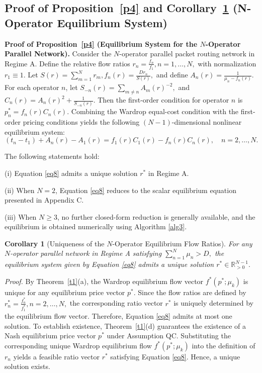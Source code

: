 \documentclass[review,3p,authoryear]{elsarticle}
\newtheorem{corollary}[theorem]{Corollary}
\begin{document}
\subsection{Proof of Proposition~\ref{p4} and Corollary~\ref{c3} (N-Operator Equilibrium System)}

\medskip\noindent\textbf{Proof of Proposition~\ref{p4} (Equilibrium System for the $N$-Operator Parallel Network).}
Consider the $N$-operator parallel packet routing network in Regime A. Define the relative flow ratios $r_{n}=\frac{f_{n}}{f_{1}},n=1,{\dots},N,$ with normalization $r_{1}\ensuremath{\equiv}1$. Let $S(r)=\sum_{m=1}^{N} r_{m},f_{n}(r)=\frac{D r_{n}}{S(r)},$ and define $A_{n}(r)=\frac{1}{{\mu}_{n}-f_{n}(r)}.$ For each operator $n$, let $S_{-n}(r)=\sum_{m{\ne}n}^{} A_{m}(r)^{-2},$ and $C_{n}(r)=A_{n}(r)^{2}+\frac{1}{S_{-n}(r)}.$ Then the first-order condition for operator $n$ is $p_{n}^{*}=f_{n}(r) C_{n}(r).$ Combining the Wardrop equal-cost condition with the first-order pricing conditions yields the following $\left(N - 1\right)$-dimensional nonlinear equilibrium system:
\begin{equation}
    (t_n - t_1) + A_n (r) - A_1 (r) = f_1 (r) C_1 (r) - f_n (r) C_n (r), \quad n = 2, \dots, N.
    \label{eq8}
\end{equation}

The following statements hold:

(i) Equation \eqref{eq8} admits a unique solution $r^{*}$ in Regime A.

(ii) When $N=2$, Equation \eqref{eq8} reduces to the scalar equilibrium equation presented in Appendix C.

(iii) When $N{\ge}3$, no further closed-form reduction is generally available, and the equilibrium is obtained numerically using Algorithm \ref{alg3}.

\begin{corollary}[Uniqueness of the $N$-Operator Equilibrium Flow Ratios]\label{c3}
For any $N$-operator parallel network in Regime A satisfying $\sum_{n=1}^{N} {\mu}_{n}>D,$ the equilibrium system given by Equation \eqref{eq8} admits a unique solution $r^{*}{\in}\mathbb{R}_{>0}^{N-1}.$
\end{corollary}

\medskip\noindent\textit{Proof.} By Theorem~\ref{t1}(a), the Wardrop equilibrium flow vector $f^{*}(p^{*};{\mu}_{k})$ is unique for any equilibrium price vector $p^{*}$. Since the flow ratios are defined by $r_{n}^{*}=\frac{f_{n}^{*}}{f_{1}^{*}},n=2,{\dots},N,$ the corresponding ratio vector $r^{*}$ is uniquely determined by the equilibrium flow vector. Therefore, Equation \eqref{eq8} admits at most one solution. To establish existence, Theorem~\ref{t1}(d) guarantees the existence of a Nash equilibrium price vector $p^{*}$ under Assumption QC. Substituting the corresponding unique Wardrop equilibrium flow $f^{*}(p^{*};{\mu}_{k})$ into the definition of $r_{n}$ yields a feasible ratio vector $r^{*}$ satisfying Equation \eqref{eq8}. Hence, a unique solution exists.
\end{document}
